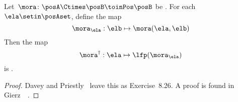 \begin{lemma}
    \label{lem:dagger}
    Let~$\mora\colon\posA\Ctimes\posB\toinPos\posB$ be \scottcontinuous.
    For each~$\ela\setin\posAset$, define the map
    \begin{equation}
        \mora_{\ela}:\elb\mapsto \mora(\ela,\elb)
    \end{equation}
    Then the map
    \begin{equation}
        \mora^{\dagger}:\ela\mapsto\lfp(\mora_{\ela})
    \end{equation} is \scottcontinuous.
\end{lemma}
\begin{proof}
    Davey and Priestly~\cite{davey02} leave this as Exercise~8.26.
    A proof is found in Gierz~\etal~\cite[Exercise II-2.29]{gierz03continuous}.
\end{proof}

